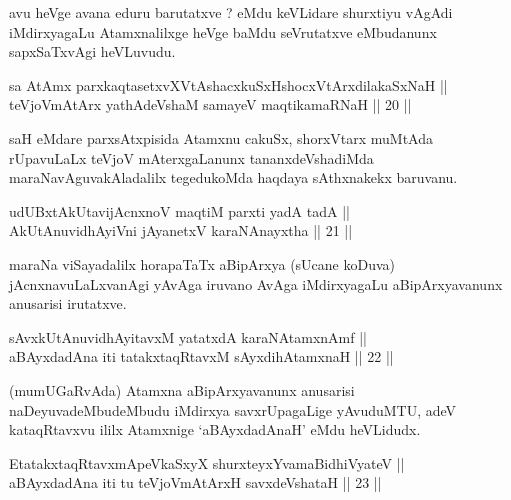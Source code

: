 \begin{artha}
avu heVge avana eduru barutatxve ? eMdu keVLidare shurxtiyu vAgAdi
iMdirxyagaLu Atamxnalilxge heVge baMdu seVrutatxve eMbudanunx
sapxSaTxvAgi heVLuvudu.
\end{artha}


\begin{shl}
sa AtAmx parxkaqtasetxvXVtAshacxkuSxHshocxVtArxdilakaSxNaH ||  \\
teVjoVmAtArx yathAdeVshaM samayeV maqtikamaRNaH \hfill || 20 ||
  
\end{shl}

\begin{artha}
saH eMdare parxsAtxpisida Atamxnu cakuSx, shorxVtarx muMtAda
rUpavuLaLx teVjoV mAterxgaLanunx tananxdeVshadiMda
maraNavAguvakAladalilx tegedukoMda haqdaya sAthxnakekx baruvanu.
\end{artha}

\begin{shl}
udUBxtAkUtavijAcnxnoV maqtiM parxti yadA tadA || \\
AkUtAnuvidhAyiVni jAyanetxV karaNAnayxtha \hfill || 21 ||
  
\end{shl}

\begin{artha}
maraNa viSayadalilx horapaTaTx aBipArxya (sUcane koDuva)
jAcnxnavuLaLxvanAgi yAvAga iruvano AvAga iMdirxyagaLu
aBipArxyavanunx anusarisi irutatxve.
\end{artha}


\begin{shl}
sAvxkUtAnuvidhAyitavxM yatatxdA karaNAtamxnAmf || \\
aBAyxdadAna iti tatakxtaqRtavxM sAyxdihA\s \s tamxnaH \hfill || 22 ||
  
\end{shl}

\begin{artha}
(mumUGaRvAda) Atamxna aBipArxyavanunx anusarisi naDeyuvadeMbudeMbudu
iMdirxya savxrUpagaLige yAvuduMTU, adeV kataqRtavxvu ililx Atamxnige
`aBAyxdadAnaH' eMdu heVLidudx.
\end{artha}

\begin{shl}
EtatakxtaqRtavxmApeVkaSxyX shurxteyxYvamaBidhiVyateV || \\
aBAyxdadAna iti tu teVjoVmAtArxH savxdeVshataH \hfill || 23 ||
  
\end{shl}

